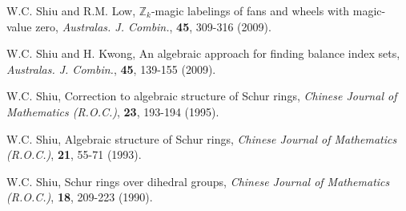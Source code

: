\item W.C. Shiu and R.M. Low, $\mathbb Z_k$-magic labelings of fans and
wheels with magic-value zero, {\it Australas. J. Combin.},
{\bf 45}, 309-316 (2009).

\item W.C. Shiu and H. Kwong, An algebraic approach for finding
balance index sets, {\it Australas. J. Combin.}, {\bf 45},
139-155 (2009).

\item W.C. Shiu, Correction to algebraic structure of Schur rings, {\it Chinese
Journal of Mathematics (R.O.C.)}, {\bf 23}, 193-194 (1995).
\item W.C. Shiu, Algebraic structure of Schur rings, {\it Chinese Journal of
Mathematics (R.O.C.)}, {\bf 21}, 55-71 (1993).

\item W.C. Shiu, Schur rings over dihedral groups, {\it Chinese Journal of
Mathematics (R.O.C.)}, {\bf 18}, 209-223 (1990).
